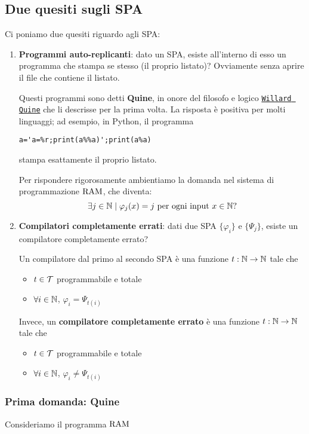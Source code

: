 \subsection{Due quesiti sugli SPA}

Ci poniamo due quesiti riguardo agli SPA:
\begin{enumerate}
	\item \textbf{Programmi auto-replicanti}: dato un SPA, esiste all'interno di esso un programma che stampa se stesso (il proprio listato)? Ovviamente senza aprire il file che contiene il listato.

	Questi programmi sono detti \textbf{Quine}, in onore del filosofo e logico \href{https://it.wikipedia.org/wiki/Willard_Van_Orman_Quine}{\texttt{Willard Quine}} che li descrisse per la prima volta. La risposta è positiva per molti linguaggi; ad esempio, in Python, il programma
	\begin{verbatim}
a='a=%r;print(a%%a)';print(a%a)
	\end{verbatim}
	stampa esattamente il proprio listato.

	Per rispondere rigorosamente ambientiamo la domanda nel sistema di programmazione $\text{RAM}$, che diventa:
	$$ \exists j \in \mathbb{N} \mid \varphi_j (x) = j \text{ per ogni input } x \in \mathbb{N} \text{?}$$

	\item \textbf{Compilatori completamente errati}: dati due SPA $\{\varphi_i\}$ e $\{\Psi_j\}$, esiste un compilatore completamente errato?

	Un compilatore dal primo al secondo SPA è una funzione $t: \mathbb{N} \rightarrow \mathbb{N}$ tale che
	\begin{itemize}
		\item $t \in \mathcal{T}$ programmabile e totale
		\item $\forall i \in \mathbb{N}$, $\varphi_i = \Psi_{t(i)}$
	\end{itemize}

	Invece, un \textbf{compilatore completamente errato} è una funzione $t: \mathbb{N} \rightarrow \mathbb{N}$ tale che
	\begin{itemize}
		\item $t \in \mathcal{T}$ programmabile e totale
		\item $\forall i \in \mathbb{N}$, $\varphi_i \neq \Psi_{t(i)}$
	\end{itemize}
\end{enumerate}

\subsubsection{Prima domanda: Quine}
Consideriamo il programma $\text{RAM}$

